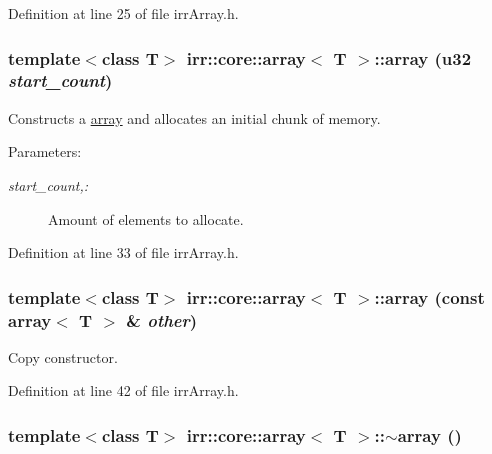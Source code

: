 Definition at line 25 of file irrArray.h.\hypertarget{classirr_1_1core_1_1array_cdf3e210bef431b4b789d616c6048b56}{
\subsubsection[{array}]{\setlength{\rightskip}{0pt plus 5cm}template$<$class T$>$ {\bf irr::core::array}$<$ T $>$::{\bf array} ({\bf u32} {\em start\_\-count})}}
\label{classirr_1_1core_1_1array_cdf3e210bef431b4b789d616c6048b56}


Constructs a \hyperlink{classirr_1_1core_1_1array}{array} and allocates an initial chunk of memory. \begin{Desc}
\item[Parameters:]
\begin{description}
\item[{\em start\_\-count,:}]Amount of elements to allocate. \end{description}
\end{Desc}


Definition at line 33 of file irrArray.h.\hypertarget{classirr_1_1core_1_1array_ddc7b26c37e43024be3240344ef7ae4b}{
\subsubsection[{array}]{\setlength{\rightskip}{0pt plus 5cm}template$<$class T$>$ {\bf irr::core::array}$<$ T $>$::{\bf array} (const {\bf array}$<$ T $>$ \& {\em other})}}
\label{classirr_1_1core_1_1array_ddc7b26c37e43024be3240344ef7ae4b}


Copy constructor. 



Definition at line 42 of file irrArray.h.\hypertarget{classirr_1_1core_1_1array_66774d7073dfe9794c1190b4a9fee73c}{
\subsubsection[{$\sim$array}]{\setlength{\rightskip}{0pt plus 5cm}template$<$class T$>$ {\bf irr::core::array}$<$ T $>$::$\sim${\bf array} ()}}
\label{classirr_1_1core_1_1array_66774d7073dfe9794c1190b4a9fee73c}


